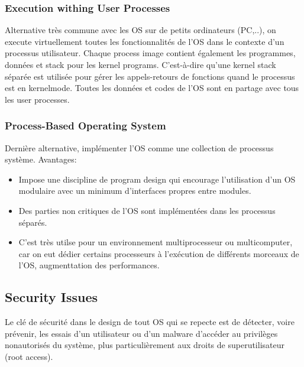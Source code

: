 \subsubsection{Execution withing User Processes}
\label{sec:uproc}
Alternative très commune avec les OS sur de petits ordinateurs (PC,..), on execute virtuellement toutes les fonctionnalités de l'OS dans le contexte d'un processus utilisateur.
Chaque process image contient également les programmes, données et stack pour les kernel programs.
C'est-à-dire qu'une kernel stack séparée est utilisée pour gérer les appels-retours de fonctions quand le processus est en kernelmode.
Toutes les données et codes de l'OS sont en partage avec tous les user processes.

\subsubsection{Process-Based Operating System}
Dernière alternative, implémenter l'OS comme une collection de processus système.
Avantages:
\begin{itemize}
  \item Impose une discipline de program design qui encourage l'utilisation d'un OS modulaire avec un minimum d'interfaces propres entre modules.
  \item Des parties non critiques de l'OS sont implémentées dans les processus séparés.
  \item C'est très utilse pour un environnement multiprocesseur ou multicomputer, car on eut dédier certains processeurs à l'exécution de différents morceaux de l'OS, augmenttation des performances.
\end{itemize}

\subsection{Security Issues}
Le clé de sécurité dans le design de tout OS qui se repecte est de détecter, voire prévenir, les essais d'un utilisateur ou d'un malware d'accéder au privilèges nonautorisés du système, plus particulièrement aux droits de superutilisateur (root access).

